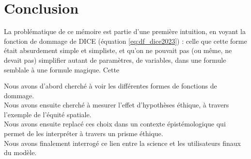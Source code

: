 \chapter{Conclusion}
\label{chapter:conclusion}
\newrefsegment



La problématique de ce mémoire est partie d'une première intuition, en voyant la fonction de dommage de DICE (équation \ref{eq:df_dice2023}) : celle que cette forme était absurdement simple et simpliste, et qu'on ne pouvait pas (ou même, ne devait pas) simplifier autant de paramètres, de variables, dans une formule semblale à une formule magique. Cette 





Nous avons d'abord cherché à voir les différentes formes de fonctions de dommage. \\

Nous avons ensuite cherché à mesurer l'effet d'hypothèses éthique, à travers l'exemple de l'équité spatiale. \\

Nous avons ensuite replacé ces choix dans un contexte épistémologique qui permet de les interpréter à travers un prisme éthique. \\

Nous avons finalement interrogé ce lien entre la science et les utilisateurs finaux du modèle. \\









